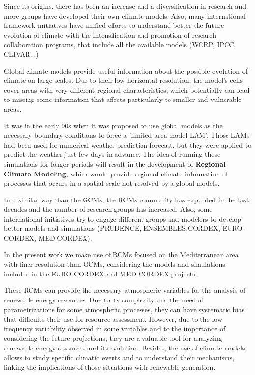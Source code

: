Since its origins, there has been an increase and a diversification in research and more groups have developed their own climate models. Also, many international framework initiatives have unified efforts to understand better the future evolution of climate with the intensification and promotion of research collaboration programs, that include all the available  models (WCRP, IPCC, CLIVAR...)   

Global climate models provide useful information about the possible evolution of climate on large scales. Due to their low horizontal resolution, the model's cells cover areas with very different regional characteristics, which potentially can lead to missing some information that affects particularly to smaller and vulnerable areas.

It was in the early 90s \cite*{Dickinson1989, Giorgi1990} when it was proposed to use global models as the necessary boundary conditions to force a 'limited area model LAM'. Those LAMs had been used for numerical weather prediction forecast, but they were applied to predict the weather just few days in advance. The idea of running these simulations for longer periods will result in the development of \textbf{Regional Climate Modeling}, which would provide regional climate information of processes that occurs in a spatial scale not resolved by a global models.

In a similar way than the GCMs, the RCMs community has expanded in the last decades and the number of research groups has increased. Also, some international initiatives try to engage different groups and modelers to develop better models and simulations (PRUDENCE, ENSEMBLES,CORDEX, EURO-CORDEX, MED-CORDEX).

In the present work we make use of RCMs focused on the Mediterranean area with finer resolution than GCMs, considering the models and simulations included in the EURO-CORDEX and MED-CORDEX projects \cite*{Jacob2014, Ruti2016}.

These RCMs can provide the necessary atmospheric variables for the analysis of renewable energy resources. Due to its complexity and the need of parametrizations for some atmospheric processes, they can have systematic bias that difficults their use for resource assessment. However, due to the low frequency variability observed in some variables and to the importance of considering the future projections, they are a valuable tool for analyzing renewable energy resources and its evolution. Besides, the use of climate models allows to study specific climatic events and to understand their mechanisms, linking the implications of those situations with renewable generation.

